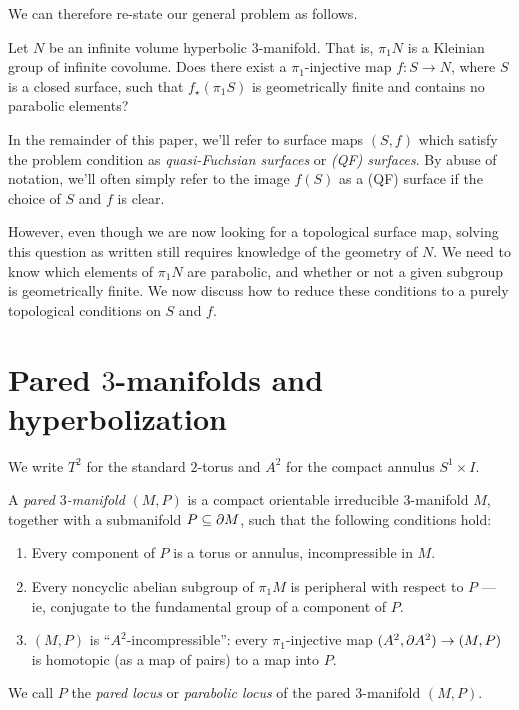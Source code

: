 We can therefore re-state our general problem as follows.

\begin{prob}

Let $N$ be an infinite volume hyperbolic $3$-manifold. That is, $\pi_1N$ is
a Kleinian group of infinite covolume. Does there exist a $\pi_1$-injective map
$f \colon S \to N$, where $S$ is a closed surface, such that $f_\star(\pi_1S)$
is geometrically finite and contains no parabolic elements?

\end{prob}

In the remainder of this paper, we'll refer to surface maps $(S,f)$ which
satisfy the problem condition as \emph{quasi-Fuchsian surfaces} or \emph{(QF)
surfaces}. By abuse of notation, we'll often simply refer to the image $f(S)$
as a (QF) surface if the choice of $S$ and $f$ is clear.

However, even though we are now looking for a topological surface map, solving
this question as written still requires knowledge of the geometry of $N$. We
need to know which elements of $\pi_1N$ are parabolic, and whether or not
a given subgroup is geometrically finite. We now discuss how to reduce these
conditions to a purely topological conditions on $S$ and $f$.

\section{Pared $3$-manifolds and hyperbolization}

\begin{ntn}

We write $T^2$ for the standard $2$-torus and $A^2$ for the compact annulus
$S^1 \times I$.

\end{ntn}

\begin{defn}

A \emph{pared $3$-manifold} $(M,P)$ is a compact orientable irreducible
$3$-manifold $M$, together with a submanifold $P\subseteq\partial M$, such that the
following conditions hold:

\begin{enumerate}
\item Every component of $P$ is a torus or annulus, incompressible in $M$.

\item Every noncyclic abelian subgroup of $\pi_1M$ is peripheral with respect
to $P$ --- ie, conjugate to the fundamental group of a component of $P$.

\item $(M,P)$ is ``$A^2$-incompressible'': every $\pi_1$-injective map $(A^2,
\partial A^2) \to (M,P)$ is homotopic (as a map of pairs) to a map into $P$.

\end{enumerate}

We call $P$ the \emph{pared locus} or \emph{parabolic locus} of the pared
$3$-manifold $(M,P)$.

\end{defn}

